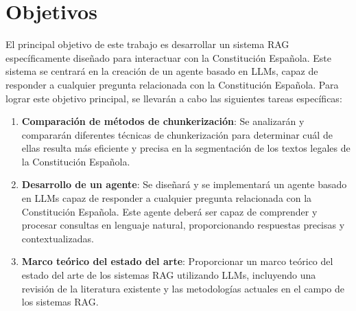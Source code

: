 
\cleardoublepage

\chapter{Objetivos}
\label{objetivos}

El principal objetivo de este trabajo es desarrollar un sistema RAG específicamente diseñado para interactuar con la Constitución Española. Este sistema se centrará en la creación de un agente basado en LLMs, capaz de responder a cualquier pregunta relacionada con la Constitución Española. Para lograr este objetivo principal, se llevarán a cabo las siguientes tareas específicas:

\begin{enumerate}
    \item \textbf{Comparación de métodos de chunkerización}: Se analizarán y compararán diferentes técnicas de chunkerización para determinar cuál de ellas resulta más eficiente y precisa en la segmentación de los textos legales de la Constitución Española.

    \item \textbf{Desarrollo de un agente}: Se diseñará y se implementará un agente basado en LLMs capaz de responder a cualquier pregunta relacionada con la Constitución Española. Este agente deberá ser capaz de comprender y procesar consultas en lenguaje natural, proporcionando respuestas precisas y contextualizadas.
    
    \item \textbf{Marco teórico del estado del arte}: Proporcionar un marco teórico del estado del arte de los sistemas RAG utilizando LLMs, incluyendo una revisión de la literatura existente y las metodologías actuales en el campo de los sistemas RAG.
\end{enumerate}